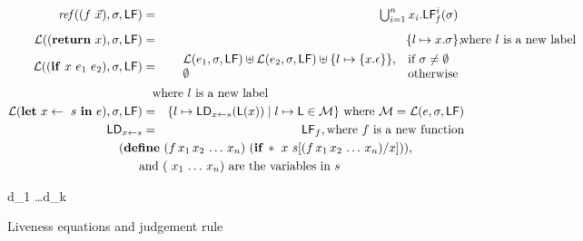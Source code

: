 \documentclass[10pt]{sigplanconf}
\def\myvec{\mathaccent"017E } %
\begin{document}
\begin{figure*}[t]
\begin{eqnarray*}
\begin{array}{l l}
                 \end{array} \\
\mathit{ref\/}((f~\myvec{x}),\sigma,\Lfonly)
          &=&  \begin{array}{@{}l}  %
               \bigcup_{i=1}^n x_i.\Lf{f}{i}{\sigma}
               \end{array}
\\[1ex]
\mathcal{L}((\RETURN~x),\sigma,\Lfonly) &=& \{l \mapsto x.\sigma\}, \makebox[0mm]{\hspace*{3cm} where $l$ is a new label} \\
\mathcal{L}((\SIF~x~e_1~e_2),\sigma,\Lfonly) &=&
        \begin{array}{l l}
                    \mathcal{L}(e_1,\sigma,\Lfonly) \uplus
        \mathcal{L}(e_2,\sigma,\Lfonly) \uplus
        \{l \mapsto  \{x.\epsilon\}\},  & \mbox{if}~\sigma \ne \emptyset\\
        \emptyset  & \mbox{otherwise}
                 \end{array} \\
 \makebox[0mm]{\hspace*{3.8cm} where $l$ is a new label}\\
\mathcal{L}(\LET~x \leftarrow~s~\IN~e),\sigma,\Lfonly) &=&
        \{ l \mapsto \Ldonly_{x \leftarrow s}(\Lv(x)) \mid l \mapsto \Lv
        \in \mathcal{M}\}
\mbox{ where } \mathcal{M} = \mathcal{L}(e,\sigma,\Lfonly)\\
\Ldonly_{x \leftarrow s} &=& \Lfonly_f, \mbox{where}~f~\mbox{is a new function}\\
 \makebox[0mm]{\hspace*{7cm}   
 $(\DEFINE~(f\,x_1\,x_2\, \ldots \, x_n)~(\SIF\,*~x~s[(f\,x_1\,
           x_2\, \ldots\, x_n)/x]))$,} \\
 \makebox[0mm]{\hspace*{5.5cm} and 
     $(\ x_1\, \ldots\, x_n)$ are the variables in $s$}
\end{eqnarray*}
\begin{minipage}{0.85\textwidth}
        { d_1 \ldots d_k \len \Lfonly
\\ }
\end{minipage}
  \caption{Liveness equations and judgement rule}\label{fig:live-judge}
\end{figure*}
\end{document}
